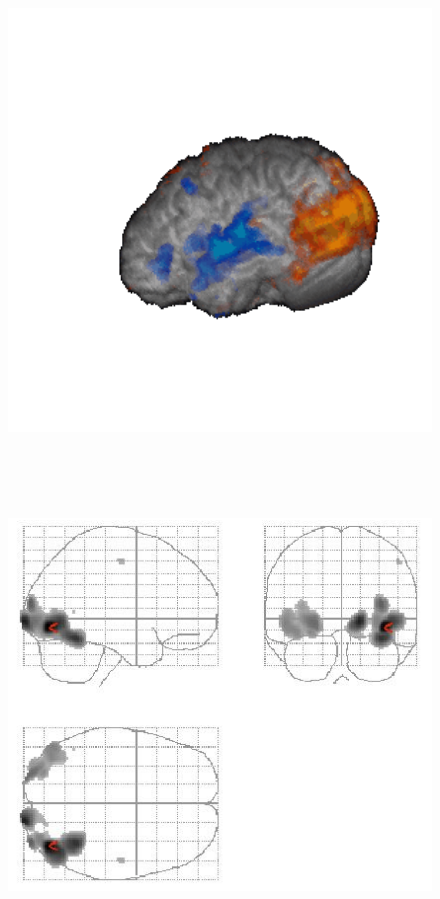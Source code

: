 \documentclass[final]{beamer}\usepackage[]{graphicx}\usepackage[]{color}
\begin{document}
\begin{frame}[fragile]
\begin{multicols}{2}
\begin{figure}
  \begin{minipage}[b]{3.5in}
    \includegraphics[width=7in, height=5in]{3d_proj.png}
  \end{minipage}\hfill
  \begin{minipage}[b]{3.5in}
    \includegraphics[width=7in, height=5in]{glass_brain.png}

\end{minipage}
\end{figure}
\end{multicols}
\end{frame}
\end{document}
